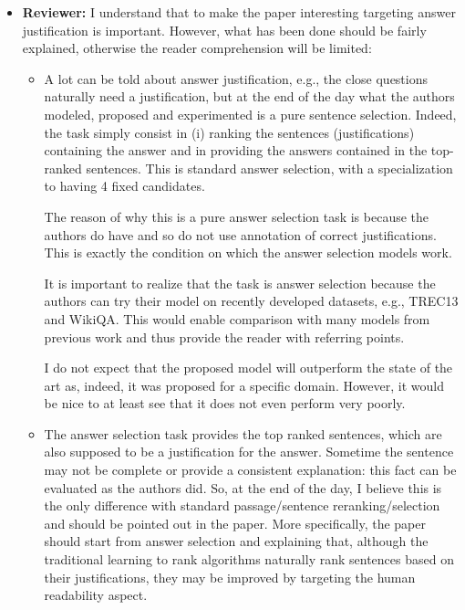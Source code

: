\documentclass[10pt]{article}
\newcommand{\todo}[1]{\textcolor{red}{TODO: #1}}
\begin{document}
\begin{itemize}
\item \textbf{Reviewer:} I understand that to make the paper interesting targeting answer
justification is important.
However, what has been done should be fairly explained, otherwise the reader
comprehension will be limited:
\begin{itemize}
        \item A lot can be told about answer justification, e.g., the close questions
naturally need a justification, but at the end of the day what the authors
modeled, proposed and experimented is a pure sentence selection.
Indeed, the task simply consist in (i) ranking the sentences
(justifications) containing the answer and in providing the answers
contained in the top-ranked sentences.
This is standard answer selection, with a specialization to having 4 fixed
candidates.

The reason of why this is a pure answer selection task is because the
authors do have and so do not use annotation of correct justifications.
This is exactly the condition on which the answer selection models work.

It is important to realize that the task is answer selection because the
authors can try their model on recently developed datasets, e.g., TREC13 and
WikiQA. This would enable comparison with many models from previous work and
thus provide the reader with referring points.

I do not expect that the proposed model will outperform the state of the art
as, indeed, it was proposed for a specific domain.
However, it would be nice to at least see that it does not even perform very
poorly.

        \item The answer selection task provides the top ranked sentences, which are
also supposed to be a justification for the answer.
Sometime the sentence may not be complete or provide a consistent
explanation: this fact can be evaluated as the authors did.
So, at the end of the day, I believe this is the only difference with
standard passage/sentence reranking/selection and should be pointed out in
the paper.
More specifically, the paper should start from answer selection and
explaining that, although the traditional learning to rank algorithms
naturally rank sentences based on their justifications, they may be improved
by targeting the human readability aspect.
\end{itemize}




\end{itemize}
\end{document}
